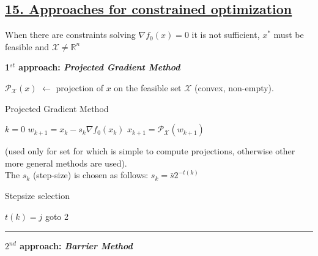 \documentclass[a4paper]{article}
\begin{document}
\subsection*{\underline{15. Approaches for constrained optimization}}
\begin{center}
    \textsf{When there are constraints solving $\nabla{f_0(x)}=0$ it is not sufficient, $x^*$ must be feasible and $\mathcal{X}\ne\mathbb{R}^n$}
\end{center}
\vspace{-0.2cm}
\textbf{1$^{st}$ approach: \textit{Projected Gradient Method}}
\vspace{-0.3cm}
\begin{multicols}{2}
    \noindent
    $\mathcal{P}_\mathcal{X}(x)$ $\leftarrow$ projection of $x$ on the feasible set $\mathcal{X}$ (convex, non-empty). 
    \vspace{-0.3cm}
    \begin{algorithm}[H]
        \caption{Projected Gradient Method}
        \begin{algorithmic}[1]
            \State $k=0$
            \State $w_{k+1}=x_{k}-s_k\nabla{f_0(x_k)}$  
            \State $x_{k+1}=\mathcal{P}_\mathcal{X}(w_{k+1})$ 
        \end{algorithmic}
    \end{algorithm}
    \vspace{-0.5cm}
    \noindent
    (used only for set for which is simple to compute projections, otherwise other more general methods are used).
    \newcolumn\\
    The $s_k$ (step-size) is chosen as follows: $s_k=\bar{s}2^{-t(k)}$
    \vspace{-0.3cm}
    \begin{algorithm}[H]
        \caption{Stepsize selection}
        \begin{algorithmic}[1]
                \State $t(k)=j$
            \Else
                \State goto 2
            \EndIf
        \end{algorithmic}
    \end{algorithm}
    \noindent
\end{multicols}
\vspace{-0.2cm}
\noindent
\rule{\textwidth}{1.3pt}
\noindent
\textbf{$2^{nd}$ approach: \textit{Barrier Method}}
\vspace{-0.4cm}
\end{document}
